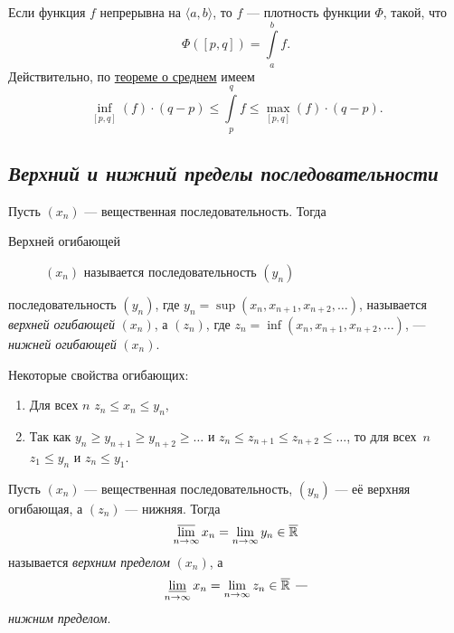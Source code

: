 \begin{example}
	Если функция \(f\) непрерывна на \(\langle a, b \rangle\), то \(f\) --- плотность функции \(\Phi\), такой, что \[
	\Phi([p, q]) = \int\limits_a^b f.
	\]
	Действительно, по \hyperlink{sredneye}{теореме о среднем} имеем\[
	\inf_{[p, q]} (f) \cdot (q - p) \leqslant \int\limits_p^q f \leqslant \max_{[p, q]} (f) \cdot (q - p).
	\]
\end{example}

\subsection{\itshape Верхний и нижний пределы последовательности}

\begin{ndefinition}
	Пусть \((x_n)\) --- вещественная последовательность. Тогда 
	\begin{description}
		\item[Верхней огибающей] \((x_n)\) называется последовательность \((y_n)\) 
	\end{description}
	
	последовательность \((y_n)\), где \(y_n = \sup (x_n, x_{n + 1}, x_{n + 2}, \ldots)\), называется \textit{верхней огибающей} \((x_n)\), а \((z_n)\), где \(z_n = \inf (x_n, x_{n + 1}, x_{n + 2}, \ldots)\), --- \textit{нижней огибающей} \((x_n)\).
\end{ndefinition}

\begin{remark}
	Некоторые свойства огибающих:
	\begin{enumerate}
		\item Для всех \(n\) \(z_n \leqslant x_n \leqslant y_n\),
		\item Так как \(y_n \geqslant y_{n + 1} \geqslant y_{n + 2} \geqslant \ldots\) и \(z_n \leqslant z_{n + 1} \leqslant z_{n + 2} \leqslant \ldots\), то для всех~\(n\) \(z_1 \leqslant y_n\) и \(z_n \leqslant y_1\).
	\end{enumerate}
\end{remark}

\begin{ndefinition}
	Пусть \((x_n)\) --- вещественная последовательность, \((y_n)\) --- её верхняя огибающая, а \((z_n)\) --- нижняя. Тогда \[
	\varlimsup_{n \to \infty} x_n = \lim_{n \to \infty} y_n \in \overline{\mathbb{R}}
	\]
	называется \textit{верхним пределом} \((x_n)\), а \[
	\varliminf\limits_{n \to \infty} x_n = \lim\limits_{n \to \infty} z_n \in \overline{\mathbb{R}} \ \textit{---}
	\]
	\textit{нижним пределом}.
\end{ndefinition}


